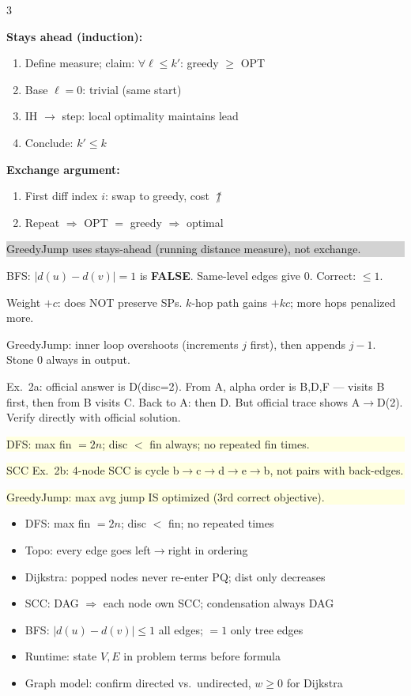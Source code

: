 \documentclass[9pt]{extarticle}
\newcommand{\yb}[1]{\vspace{1pt}\noindent\colorbox{lightyellow}{\parbox{\dimexpr\linewidth-2\fboxsep}{\footnotesize\sffamily #1}}\vspace{1pt}}
\newcommand{\rb}[1]{\vspace{1pt}\noindent\colorbox{lightred}   {\parbox{\dimexpr\linewidth-2\fboxsep}{\footnotesize\sffamily #1}}\vspace{1pt}}
\newcommand{\grb}[1]{\vspace{1pt}\noindent\colorbox{lightgray} {\parbox{\dimexpr\linewidth-2\fboxsep}{\footnotesize\sffamily #1}}\vspace{1pt}}
\begin{document}
\begin{multicols}{3}
\vspace{3pt}
\begin{tcolorbox}[red,title=Greedy Proof Reference]
\small
\textbf{Stays ahead (induction):}
\begin{enumerate}
  \item Define measure; claim: $\forall\ell\leq k'$: greedy $\geq$ OPT
  \item Base $\ell{=}0$: trivial (same start)
  \item IH $\to$ step: local optimality maintains lead
  \item Conclude: $k'\leq k$
\end{enumerate}
\textbf{Exchange argument:}
\begin{enumerate}
  \item First diff index $i$: swap to greedy, cost $\not\uparrow$
  \item Repeat $\Rightarrow$ OPT $=$ greedy $\Rightarrow$ optimal
\end{enumerate}
\grb{GreedyJump uses stays-ahead (running distance measure), not exchange.}
\end{tcolorbox}

\vspace{3pt}
\begin{tcolorbox}[red,title=Common Mistakes]
\small
\rb{BFS: $|d(u)-d(v)|=1$ is \textbf{FALSE}. Same-level edges give 0. Correct: $\leq 1$.}
\rb{Weight $+c$: does NOT preserve SPs. $k$-hop path gains $+kc$; more hops penalized more.}
\rb{GreedyJump: inner loop overshoots (increments $j$ first), then appends $j-1$. Stone 0 always in output.}
\rb{Ex.\ 2a: official answer is D(disc=2). From A, alpha order is B,D,F --- visits B first, then from B visits C. Back to A: then D. But official trace shows A$\to$D(2). Verify directly with official solution.}
\yb{DFS: max fin $=2n$; disc $<$ fin always; no repeated fin times.}
\yb{SCC Ex.\ 2b: 4-node SCC is cycle b$\to$c$\to$d$\to$e$\to$b, not pairs with back-edges.}
\yb{GreedyJump: max avg jump IS optimized (3rd correct objective).}
\end{tcolorbox}

\vspace{3pt}
\begin{tcolorbox}[red,title=Exam Sanity Checks]
\small
\begin{itemize}
  \item DFS: max fin $=2n$; disc $<$ fin; no repeated times
  \item Topo: every edge goes left$\to$right in ordering
  \item Dijkstra: popped nodes never re-enter PQ; dist only decreases
  \item SCC: DAG $\Rightarrow$ each node own SCC; condensation always DAG
  \item BFS: $|d(u)-d(v)|\leq 1$ all edges; $=1$ only tree edges
  \item Runtime: state $V,E$ in problem terms before formula
  \item Graph model: confirm directed vs.\ undirected, $w\geq 0$ for Dijkstra
\end{itemize}
\end{tcolorbox}

\end{multicols}
\end{document}
